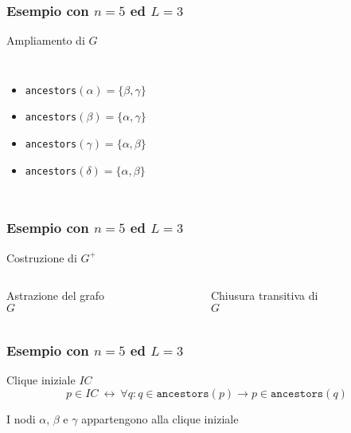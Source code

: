 \documentclass{beamer}
\begin{document}
\begin{frame}\frametitle{Esempio con $n=5$ ed $L=3$}
Ampliamento di $G$
\begin{columns}[c]
    		\begin{itemize}
			\item[]\texttt{ancestors}$(\alpha)=\{\beta,\gamma\}$
			\item[]\texttt{ancestors}$(\beta)=\{\alpha,\gamma\}$
			\item[]\texttt{ancestors}$(\gamma)=\{\alpha,\beta\}$
			\item[]\texttt{ancestors}$(\delta)=\{\alpha,\beta\}$
    		\end{itemize}
    		\begin{figure}\centering\end{figure}
\end{columns}
\end{frame}


\begin{frame}\frametitle{Esempio con $n=5$ ed $L=3$}
Costruzione di $G^+$\vspace*{.5cm}
\begin{columns}[c]
    		Astrazione del grafo $G$
    		\begin{figure}\centering\end{figure}
    		Chiusura transitiva di $G$
    		\begin{figure}\centering\end{figure}
\end{columns}
\end{frame}


\begin{frame}\frametitle{Esempio con $n=5$ ed $L=3$}
Clique iniziale $IC$
$$p\in IC \ \leftrightarrow\ \forall q: q\in\texttt{ancestors}(p)\rightarrow p\in\texttt{ancestors}(q)$$
\begin{figure}\centering\end{figure}
\begin{center}I nodi $\alpha$, $\beta$ e $\gamma$ appartengono alla clique iniziale\end{center}
\end{frame}
\end{document}
